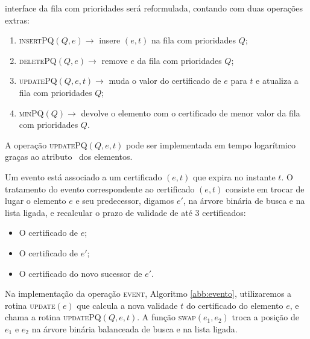 interface da fila com prioridades será reformulada,
contando com duas operações extras:
\begin{enumerate}
    \item \textsc{insertPQ}$(Q, e) \rightarrow$ insere $(e, t)$
    na fila com prioridades $Q$;
    \item \textsc{deletePQ}$(Q, e) \rightarrow$ remove $e$
    da fila com prioridades $Q$;
    \item \textsc{updatePQ}$(Q,e,t) \rightarrow$ muda o
    valor do certificado de $e$ para $t$ e atualiza a fila
    com prioridades $Q$;
    \item \textsc{minPQ}$(Q) \rightarrow$ devolve o elemento
    com o certificado de menor valor da fila com prioridades $Q$.
\end{enumerate}
A operação \textsc{updatePQ}$(Q,e,t)$ pode ser
implementada em tempo logarítmico graças ao atributo
\pqpos~dos elementos.

Um evento está associado a um certificado $(e, t)$ que
expira no instante $t$. O tratamento do evento correspondente
ao certificado $(e, t)$ consiste em trocar de lugar o
elemento $e$ e seu predecessor, digamos $e'$, na
árvore binária de busca e na lista ligada, e
recalcular o prazo de validade de até 3 certificados:
\begin{itemize}
    \item O certificado de $e$;
    \item O certificado de $e'$;
    \item O certificado do novo sucessor de $e'$.
\end{itemize}

Na implementação da operação \textsc{event}, Algoritmo
\ref{abb:evento}, utilizaremos a rotina \textsc{update}$(e)$ que
calcula a nova validade $t$ do certificado do elemento $e$, e chama
a rotina \textsc{updatePQ}$(Q, e, t)$. A função \textsc{swap}$(e_1,
e_2)$ troca a posição de $e_1$ e $e_2$ na árvore binária balanceada
de busca e na lista ligada.










